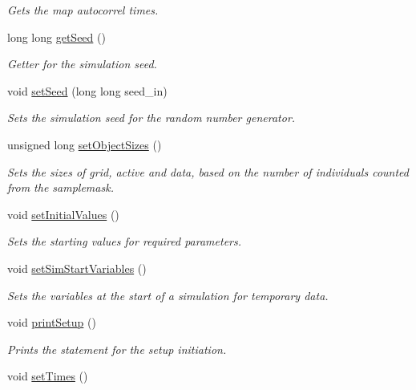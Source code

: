 \begin{DoxyCompactItemize}
\begin{DoxyCompactList}\small\item\em Gets the map autocorrel times. \end{DoxyCompactList}\item 
long long \hyperlink{class_tree_a857521315ca6bd9b3300d099488d74f1}{get\+Seed} ()
\begin{DoxyCompactList}\small\item\em Getter for the simulation seed. \end{DoxyCompactList}\item 
void \hyperlink{class_tree_ab240ab1988cbde281a6811b3fdc1dd5d}{set\+Seed} (long long seed\+\_\+in)
\begin{DoxyCompactList}\small\item\em Sets the simulation seed for the random number generator. \end{DoxyCompactList}\item 
unsigned long \hyperlink{class_tree_a869ab0aba75336f737cbb137c74b8abc}{set\+Object\+Sizes} ()
\begin{DoxyCompactList}\small\item\em Sets the sizes of grid, active and data, based on the number of individuals counted from the samplemask. \end{DoxyCompactList}\item 
void \hyperlink{class_tree_aec2640897132a1b667e852bbafc14c78}{set\+Initial\+Values} ()\hypertarget{class_tree_aec2640897132a1b667e852bbafc14c78}{}\label{class_tree_aec2640897132a1b667e852bbafc14c78}

\begin{DoxyCompactList}\small\item\em Sets the starting values for required parameters. \end{DoxyCompactList}\item 
void \hyperlink{class_tree_a1ba0f5d27c6ef6e9e17f988aff2dfe65}{set\+Sim\+Start\+Variables} ()
\begin{DoxyCompactList}\small\item\em Sets the variables at the start of a simulation for temporary data. \end{DoxyCompactList}\item 
void \hyperlink{class_tree_ab71da7797a6586ddd948661c34ce4788}{print\+Setup} ()
\begin{DoxyCompactList}\small\item\em Prints the statement for the setup initiation. \end{DoxyCompactList}\item 
void \hyperlink{class_tree_ae3fb33c46cf7e3af44604a9875b375a3}{set\+Times} ()\hypertarget{class_tree_ae3fb33c46cf7e3af44604a9875b375a3}{}\label{class_tree_ae3fb33c46cf7e3af44604a9875b375a3}


\end{DoxyCompactItemize}
